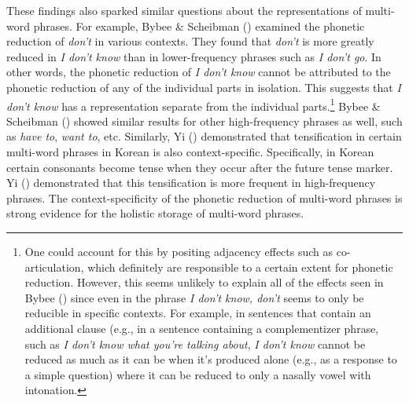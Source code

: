 \documentclass[
  12pt,
]{scrartcl}
\begin{document}
These findings also sparked similar questions about the representations
of multi-word phrases. For example, Bybee \& Scheibman
() examined the phonetic
reduction of \emph{don't} in various contexts. They found that
\emph{don't} is more greatly reduced in \emph{I don't know} than in
lower-frequency phrases such as \emph{I don't go}. In other words, the
phonetic reduction of \emph{I don't know} cannot be attributed to the
phonetic reduction of any of the individual parts in isolation. This
suggests that \emph{I don't know} has a representation separate from the
individual parts.\footnote{One could account for this by positing
  adjacency effects such as co-articulation, which definitely are
  responsible to a certain extent for phonetic reduction. However, this
  seems unlikely to explain all of the effects seen in Bybee
  () since even in the
  phrase \emph{I don't know, don't} seems to only be reducible in
  specific contexts. For example, in sentences that contain an
  additional clause (e.g., in a sentence containing a complementizer
  phrase, such as \emph{I don't know what you're talking about}, \emph{I
  don't know} cannot be reduced as much as it can be when it's produced
  alone (e.g., as a response to a simple question) where it can be
  reduced to only a nasally vowel with intonation.} Bybee \& Scheibman
() showed similar
results for other high-frequency phrases as well, such as \emph{have
to}, \emph{want to}, etc. Similarly, Yi
() demonstrated that
tensification in certain multi-word phrases in Korean is also
context-specific. Specifically, in Korean certain consonants become
tense when they occur after the future tense marker. Yi
() demonstrated that
this tensification is more frequent in high-frequency phrases. The
context-specificity of the phonetic reduction of multi-word phrases is
strong evidence for the holistic storage of multi-word phrases.
\end{document}
